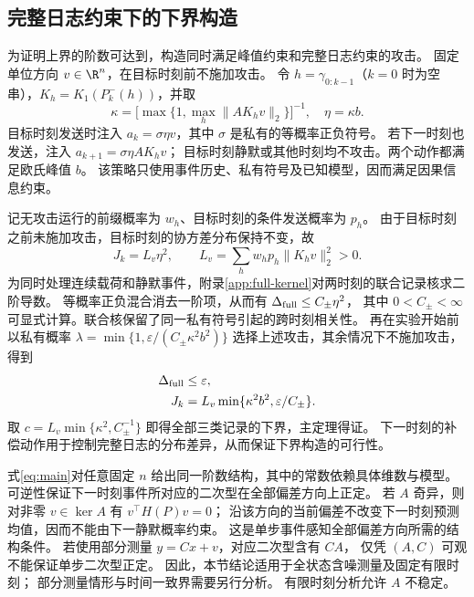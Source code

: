 \subsection{完整日志约束下的下界构造}
为证明上界的阶数可达到，构造同时满足峰值约束和完整日志约束的攻击。
固定单位方向 $v\in\R^n$，在目标时刻前不施加攻击。
令 $h=\gamma_{0:k-1}$（$k=0$ 时为空串），$K_h=K_1(P_k^-(h))$，并取
\begin{equation}
 \kappa=\bigl[\max\{1,\max_h\|AK_hv\|_2\}\bigr]^{-1},\quad \eta=\kappa b.
 \label{eq:kappa}
\end{equation}
目标时刻发送时注入 $a_k=\sigma\eta v$，其中 $\sigma$ 是私有的等概率正负符号。
若下一时刻也发送，注入 $a_{k+1}=\sigma\eta AK_hv$；
目标时刻静默或其他时刻均不攻击。两个动作都满足欧氏峰值 $b$。
该策略只使用事件历史、私有符号及已知模型，因而满足因果信息约束。

记无攻击运行的前缀概率为 $w_h$、目标时刻的条件发送概率为 $p_h$。
由于目标时刻之前未施加攻击，目标时刻的协方差分布保持不变，故
\begin{equation}
 J_k=L_v\eta^2,\qquad L_v=\sum_hw_hp_h\|K_hv\|_2^2>0.
 \label{eq:lower-damage}
\end{equation}
为同时处理连续载荷和静默事件，附录\ref{app:full-kernel}对两时刻的联合记录核求二阶导数。
等概率正负混合消去一阶项，从而有 $\Delta_{\rm full}\le C_\pm\eta^2$，
其中 $0<C_\pm<\infty$ 可显式计算。联合核保留了同一私有符号引起的跨时刻相关性。
再在实验开始前以私有概率
$\lambda=\min\{1,\varepsilon/(C_\pm\kappa^2b^2)\}$ 选择上述攻击，其余情况下不施加攻击，得到
\begin{equation}
 \begin{aligned}
 \Delta_{\rm full}&\le\varepsilon,\\
 J_k&=L_v\min\{\kappa^2b^2,\varepsilon/C_\pm\}.
 \end{aligned}
 \label{eq:attainable}
\end{equation}
取 $c=L_v\min\{\kappa^2,C_\pm^{-1}\}$ 即得全部三类记录的下界，主定理得证。
下一时刻的补偿动作用于控制完整日志的分布差异，从而保证下界构造的可行性。

\begin{remark}[维数、观测条件和时间范围]
式\eqref{eq:main}对任意固定 $n$ 给出同一阶数结构，其中的常数依赖具体维数与模型。
可逆性保证下一时刻事件所对应的二次型在全部偏差方向上正定。
若 $A$ 奇异，则对非零 $v\in\ker A$ 有 $v^\top H(P)v=0$；
沿该方向的当前偏差不改变下一时刻预测均值，因而不能由下一静默概率约束。
这是单步事件感知全部偏差方向所需的结构条件。
若使用部分测量 $y=Cx+v$，对应二次型含有 $CA$，
仅凭 $(A,C)$ 可观不能保证单步二次型正定。
因此，本节结论适用于全状态含噪测量及固定有限时刻；
部分测量情形与时间一致界需要另行分析。
有限时刻分析允许 $A$ 不稳定。
\end{remark}
